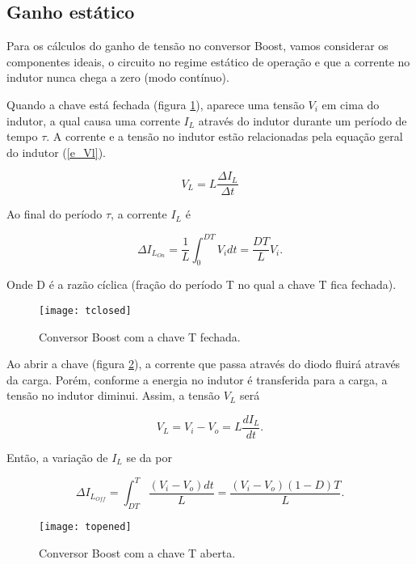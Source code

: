\subsection{Ganho estático}

    Para os cálculos do ganho de tensão no conversor Boost, vamos considerar os componentes ideais, o circuito no regime estático de operação e que a corrente no indutor nunca chega a zero (modo contínuo).
    
    Quando a chave está fechada (figura \ref{f_tclosed}), aparece uma tensão $V_i$ em cima do indutor, a qual causa uma corrente $I_L$ através do indutor durante um período de tempo $\tau$. A corrente e a tensão no indutor estão relacionadas pela equação geral do indutor (\ref{e_Vl}).
    
    \begin{equation}
        V_L = L\frac{\Delta I_L}{\Delta t}
        \label{e_Vl}
    \end{equation}

    Ao final do período $\tau$, a corrente $I_L$ é
    
    \begin{equation}
        \Delta I_{L_{On}}=\frac{1}{L}\int_0^{D T}V_i d t=\frac{D T}{L} V_i.
        \label{e_ilon}
    \end{equation}
    
    Onde D é a razão cíclica (fração do período T no qual a chave T fica fechada).

    \begin{figure}[H]
        \centering
        \caption{Conversor Boost com a chave T fechada.}
        \texttt{[image: tclosed]}
        \label{f_tclosed}
    \end{figure}

    Ao abrir a chave (figura \ref{f_opened}), a corrente que passa através do diodo fluirá através da carga. Porém, conforme a energia no indutor é transferida para a carga, a tensão no indutor diminui. Assim, a tensão $V_L$ será

    \[
        V_L = V_i-V_o = L\frac{dI_L}{dt}.
    \]

    Então, a variação de $I_L$ se da por

    
    \begin{equation}
        \Delta I_{L_{Off}}=\int_{DT}^{T}\frac{\left(V_i-V_o\right) dt}{L}=\frac{\left(V_i-V_o\right) \left(1-D\right) T}{L}.
        \label{e_iloff}
    \end{equation}
    

\begin{figure}[H]
    \centering
    \caption{Conversor Boost com a chave T aberta.}
    \texttt{[image: topened]}
    \label{f_opened}
\end{figure}

